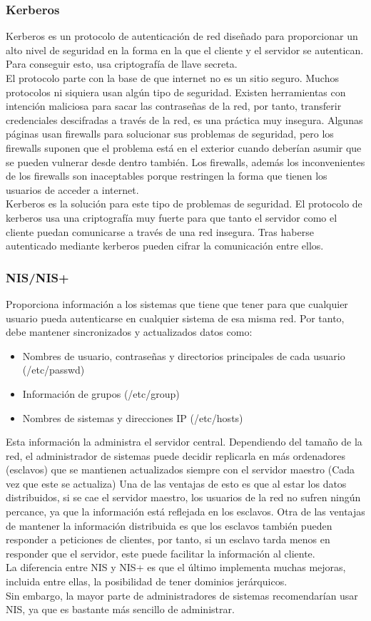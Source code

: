 \documentclass[titlepage]{article}
\begin{document}
\subsubsection{Kerberos}
Kerberos es un protocolo de autenticación de red diseñado para proporcionar un alto nivel de seguridad en la forma en la que el cliente y el servidor se autentican. Para conseguir esto, usa criptografía de llave secreta.\cite{mit-kerberos}\\El protocolo parte con la base de que internet no es un sitio seguro. Muchos protocolos ni siquiera usan algún tipo de seguridad. Existen herramientas con intención maliciosa para sacar las contraseñas de la red, por tanto, transferir credenciales descifradas a través de la red, es una práctica muy insegura. Algunas páginas usan \Gls{firewalls} para solucionar sus problemas de seguridad, pero los \Gls{firewalls} suponen que el problema está en el exterior cuando deberían asumir que se pueden vulnerar desde dentro también. Los firewalls, además los inconvenientes de los firewalls son inaceptables porque restringen la forma que tienen los usuarios de acceder a internet.\\Kerberos es la solución para este tipo de problemas de seguridad. El protocolo de kerberos usa una criptografía muy fuerte para que tanto el servidor como el cliente puedan comunicarse a través de una red insegura. Tras haberse autenticado mediante \Gls{kerberos} pueden cifrar la comunicación entre ellos.
\subsubsection{\Gls{NIS/NIS+}}
Proporciona información a los sistemas que tiene que tener para que cualquier usuario pueda autenticarse en cualquier sistema de esa misma red. Por tanto, debe mantener sincronizados y actualizados datos como:
\begin{itemize}
	\item Nombres de usuario, contraseñas y directorios principales de cada usuario (/etc/passwd)
	\item Información de grupos (/etc/group)
	\item Nombres de sistemas y direcciones IP (/etc/hosts)
\end{itemize}
Esta información la administra el servidor central. Dependiendo del tamaño de la red, el administrador de sistemas puede decidir replicarla en más ordenadores (esclavos) que se mantienen actualizados siempre con el servidor maestro (Cada vez que este se actualiza) Una de las ventajas de esto es que al estar los datos distribuidos, si se cae el servidor maestro, los usuarios de la red no sufren ningún percance, ya que la información está reflejada en los esclavos. Otra de las ventajas de mantener la información distribuida es que los esclavos también pueden responder a peticiones de clientes, por tanto, si un esclavo tarda menos en responder que el servidor, este puede facilitar la información al cliente.\\La diferencia entre NIS y NIS+ es que el último implementa muchas mejoras, incluida entre ellas, la posibilidad de tener dominios jerárquicos.\\Sin embargo, la mayor parte de administradores de sistemas recomendarían usar NIS, ya que es bastante más sencillo de administrar.
\end{document}

